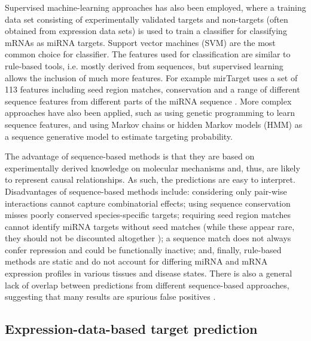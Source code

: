 
Supervised machine-learning approaches has also been employed, where a
training data set consisting of experimentally validated targets and non-targets
(often obtained from expression data sets) is used to train a
classifier for classifying mRNAs as miRNA targets. Support vector machines (SVM)
are the most common choice for classifier. The features used for classification
are similar to rule-based tools, i.e. mostly derived from sequences, but supervised
learning allows the inclusion of much more features. For example mirTarget
uses a set of 113 features including seed region matches, conservation and a
range of different sequence features from different parts of the miRNA
sequence \citep{Wang2008}. More complex approaches have also been applied,
such as using genetic programming to learn sequence features, and using
Markov chains or hidden Markov models (HMM) as a sequence
generative model to estimate targeting probability.


The advantage of sequence-based methods is that they are based on
experimentally derived knowledge on molecular mechanisms and, thus, are likely
to represent causal relationships. As such, the predictions are easy to
interpret. Disadvantages of sequence-based methods include: considering only
pair-wise interactions cannot capture combinatorial effects; using sequence
conservation misses poorly conserved species-specific targets; requiring seed
region matches cannot identify miRNA targets without seed matches (while these
appear rare, they should not be discounted altogether \citep{Bartel2009}); a
sequence match does not always confer %
repression and could be functionally inactive; and, finally, rule-based
methods are static and do not account for differing miRNA and mRNA expression
profiles in various tissues and disease states. There is also a general lack
of overlap between predictions from different sequence-based approaches,
suggesting that many results are spurious false positives
\citep{Muniategui2013}.




\subsection{Expression-data-based target prediction}\label{expr-methods}

